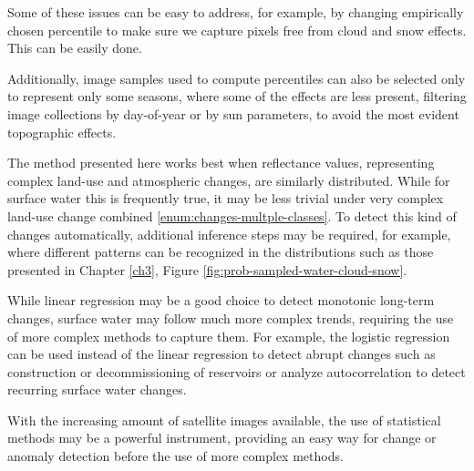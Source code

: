 Some of these issues can be easy to address, for example, by changing empirically chosen percentile to make sure we capture pixels free from cloud and snow effects. This can be easily done.

Additionally, image samples used to compute percentiles can also be selected only to represent only some seasons, where some of the effects are less present, filtering image collections by day-of-year or by sun parameters, to avoid the most evident topographic effects. 

The method presented here works best when reflectance values, representing complex land-use and atmospheric changes, are similarly distributed. While for surface water this is frequently true, it may be less trivial under very complex land-use change combined \ref{enum:changes-multple-classes}. To detect this kind of changes automatically, additional inference steps may be required, for example, where different patterns can be recognized in the distributions such as those presented in Chapter \ref{ch3}, Figure \ref{fig:prob-sampled-water-cloud-snow}.

While linear regression may be a good choice to detect monotonic long-term changes, surface water may follow much more complex trends, requiring the use of more complex methods to capture them. For example, the logistic regression can be used instead of the linear regression to detect abrupt changes such as construction or decommissioning of reservoirs or analyze autocorrelation to detect recurring surface water changes.

With the increasing amount of satellite images available, the use of statistical methods may be a powerful instrument, providing an easy way for change or anomaly detection before the use of more complex methods.


